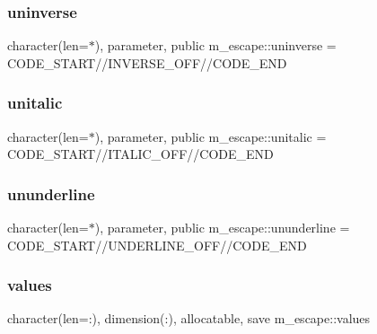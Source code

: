 \mbox{\label{namespacem__escape_a067207898e3ef5118bc1cad83f40dad8}} 
\subsubsection{\texorpdfstring{uninverse}{uninverse}}
{\footnotesize\ttfamily character(len=$\ast$), parameter, public m\+\_\+escape\+::uninverse = C\+O\+D\+E\+\_\+\+S\+T\+A\+RT//I\+N\+V\+E\+R\+S\+E\+\_\+\+O\+FF//C\+O\+D\+E\+\_\+\+E\+ND}

\mbox{\label{namespacem__escape_a6b95826bb2793069e7fa8f8386bdb520}} 
\subsubsection{\texorpdfstring{unitalic}{unitalic}}
{\footnotesize\ttfamily character(len=$\ast$), parameter, public m\+\_\+escape\+::unitalic = C\+O\+D\+E\+\_\+\+S\+T\+A\+RT//I\+T\+A\+L\+I\+C\+\_\+\+O\+FF//C\+O\+D\+E\+\_\+\+E\+ND}

\mbox{\label{namespacem__escape_adbaa599772d5df6567d75188ac3258bf}} 
\subsubsection{\texorpdfstring{ununderline}{ununderline}}
{\footnotesize\ttfamily character(len=$\ast$), parameter, public m\+\_\+escape\+::ununderline = C\+O\+D\+E\+\_\+\+S\+T\+A\+RT//U\+N\+D\+E\+R\+L\+I\+N\+E\+\_\+\+O\+FF//C\+O\+D\+E\+\_\+\+E\+ND}

\mbox{\label{namespacem__escape_a4c3b430bde66148e6f2c79c5418384fa}} 
\subsubsection{\texorpdfstring{values}{values}}
{\footnotesize\ttfamily character(len=\+:), dimension(\+:), allocatable, save m\+\_\+escape\+::values\hspace{0.3cm}{\ttfamily [private]}}

